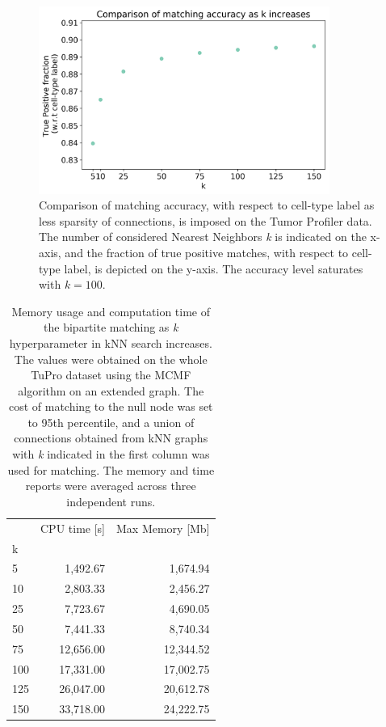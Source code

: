 \begin{figure}[h]
    \centering
    \includegraphics[width=0.85\textwidth]{figures/integration/matching-tune-k-unicapacity.png}
    \caption{Comparison of matching accuracy, with respect to cell-type label as less sparsity of connections, is imposed on the Tumor Profiler data.
The number of considered Nearest Neighbors \textit{k} is indicated on the x-axis, and the fraction of true positive matches, with respect to cell-type label, is depicted on the y-axis.
 The accuracy level saturates with $k=100$.}
    \label{fig:matching_accuracy_log10_uni}
\end{figure}

\begin{table}[h]
\centering
\begin{tabular}{lrr}
\toprule
{} &  CPU time [s] &  Max Memory [Mb] \\
k   &               &                  \\
\midrule
5   &       1,492.67 &          1,674.94 \\
10  &       2,803.33 &          2,456.27 \\
25  &       7,723.67 &          4,690.05 \\
50  &       7,441.33 &          8,740.34 \\
75  &      12,656.00 &         12,344.52 \\
100 &      17,331.00 &         17,002.75 \\
125 &      26,047.00 &         20,612.78 \\
150 &      33,718.00 &         24,222.75 \\
\bottomrule
\end{tabular}

\caption{Memory usage and computation time of the bipartite matching as \textit{k} hyperparameter in kNN search increases.
The values were obtained on the whole TuPro dataset using the MCMF algorithm on an extended graph. %
The cost of matching to the null node was set to 95th percentile, and a union of connections obtained from kNN graphs with \textit{k} indicated in the first column was used for matching.
The memory and time reports were averaged across three independent runs.}
\label{tbl:menytek_tune_k_uni}
\end{table}

